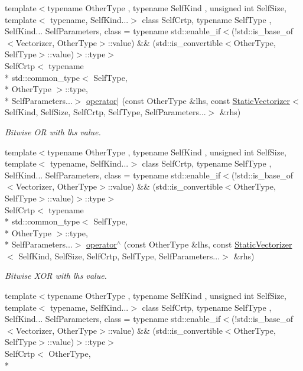 \begin{DoxyCompactItemize}
{\footnotesize template$<$typename Other\-Type , typename Self\-Kind , unsigned int Self\-Size, template$<$ typename, Self\-Kind...$>$ class Self\-Crtp, typename Self\-Type , Self\-Kind... Self\-Parameters, class  = typename std\-::enable\-\_\-if$<$(!std\-::is\-\_\-base\-\_\-of$<$\-Vectorizer, Other\-Type$>$\-::value) \&\& (std\-::is\-\_\-convertible$<$\-Other\-Type, Self\-Type$>$\-::value)$>$\-::type$>$ }\\Self\-Crtp$<$ typename \\*
std\-::common\-\_\-type$<$ Self\-Type, \\*
Other\-Type $>$\-::type, \\*
Self\-Parameters...$>$ \hyperlink{namespacemagrathea_a509316d7acef6deb88f2ec89bdcc9d70}{operator$|$} (const Other\-Type \&lhs, const \hyperlink{classmagrathea_1_1StaticVectorizer}{Static\-Vectorizer}$<$ Self\-Kind, Self\-Size, Self\-Crtp, Self\-Type, Self\-Parameters...$>$ \&rhs)
\begin{DoxyCompactList}\small\item\em Bitwise O\-R with lhs value. \end{DoxyCompactList}\item 
{\footnotesize template$<$typename Other\-Type , typename Self\-Kind , unsigned int Self\-Size, template$<$ typename, Self\-Kind...$>$ class Self\-Crtp, typename Self\-Type , Self\-Kind... Self\-Parameters, class  = typename std\-::enable\-\_\-if$<$(!std\-::is\-\_\-base\-\_\-of$<$\-Vectorizer, Other\-Type$>$\-::value) \&\& (std\-::is\-\_\-convertible$<$\-Other\-Type, Self\-Type$>$\-::value)$>$\-::type$>$ }\\Self\-Crtp$<$ typename \\*
std\-::common\-\_\-type$<$ Self\-Type, \\*
Other\-Type $>$\-::type, \\*
Self\-Parameters...$>$ \hyperlink{namespacemagrathea_a722f2644135e162e6775db15c084bf00}{operator$^\wedge$} (const Other\-Type \&lhs, const \hyperlink{classmagrathea_1_1StaticVectorizer}{Static\-Vectorizer}$<$ Self\-Kind, Self\-Size, Self\-Crtp, Self\-Type, Self\-Parameters...$>$ \&rhs)
\begin{DoxyCompactList}\small\item\em Bitwise X\-O\-R with lhs value. \end{DoxyCompactList}\item 
{\footnotesize template$<$typename Other\-Type , typename Self\-Kind , unsigned int Self\-Size, template$<$ typename, Self\-Kind...$>$ class Self\-Crtp, typename Self\-Type , Self\-Kind... Self\-Parameters, class  = typename std\-::enable\-\_\-if$<$(!std\-::is\-\_\-base\-\_\-of$<$\-Vectorizer, Other\-Type$>$\-::value) \&\& (std\-::is\-\_\-convertible$<$\-Other\-Type, Self\-Type$>$\-::value)$>$\-::type$>$ }\\Self\-Crtp$<$ Other\-Type, \\*

\end{DoxyCompactItemize}
